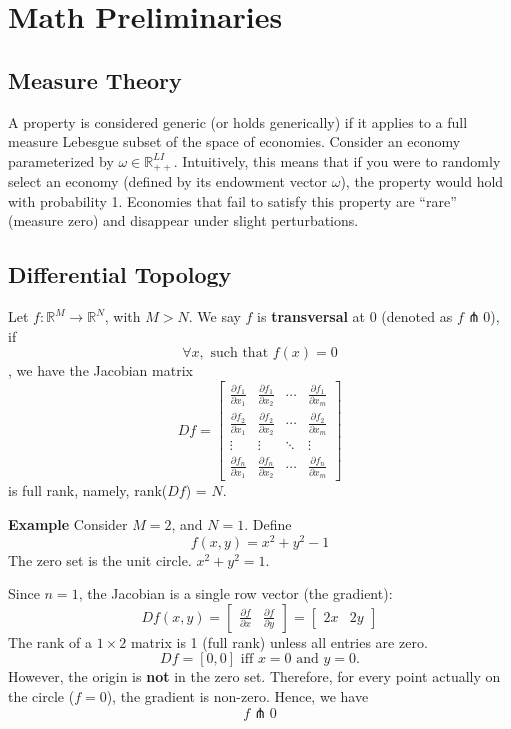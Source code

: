\chapter{Math Preliminaries}


\section{Measure Theory}
\begin{definition}[Genericity]
    A property is considered generic (or holds generically) 
    if it applies to a full measure Lebesgue subset of the space of economies. 
    Consider an economy parameterized by $\omega \in \mathbb{R}_{++}^{LI}$.
    Intuitively, this means that if you were to randomly select an economy 
    (defined by its endowment vector $\omega$), 
    the property would hold with probability 1. 
    Economies that fail to satisfy this property are ``rare'' (measure zero) 
    and disappear under slight perturbations.
\end{definition}


\section{Differential Topology}
\begin{definition}[Transversality]
    Let $f: \mathbb{R}^M \rightarrow \mathbb{R}^N$, with $M > N$.
    We say $f$ is \textbf{transversal} at $0$ (denoted as $f \pitchfork 0$), if 
    \[ \forall x, \text{ such that } f(x) = 0\], we have the Jacobian matrix
    \[
    Df = \begin{bmatrix}
    \frac{\partial f_1}{\partial x_1} & \frac{\partial f_1}{\partial x_2} & \cdots & \frac{\partial f_1}{\partial x_m} \\
    \frac{\partial f_2}{\partial x_1} & \frac{\partial f_2}{\partial x_2} & \cdots & \frac{\partial f_2}{\partial x_m} \\
    \vdots & \vdots & \ddots & \vdots \\
    \frac{\partial f_n}{\partial x_1} & \frac{\partial f_n}{\partial x_2} & \cdots & \frac{\partial f_n}{\partial x_m}
    \end{bmatrix} 
    \] is full rank, namely, rank($Df$) = $N$.
\end{definition}

\noindent \textbf{Example}
Consider $M = 2$, and $N = 1$.
Define
\[
f(x, y) = x^2 + y^2 - 1
\]
The zero set is the unit circle. $x^2 + y^2 = 1$.

Since $n=1$, the Jacobian is a single row vector (the gradient):
\[
Df(x,y) = 
\begin{bmatrix}
    \frac{\partial f}{\partial x} & \frac{\partial f}{\partial y}
\end{bmatrix}
= 
\begin{bmatrix}
    2x & 2y
\end{bmatrix}
\]
The rank of a $1 \times 2$ matrix is 1 (full rank) unless all entries are zero.
\[
Df = [0, 0] \text{ iff } x = 0 \text{ and } y = 0.
\]
However, the origin is \textbf{not} in the zero set. 
Therefore, for every point actually on the circle ($f=0$), the gradient is non-zero.
Hence, we have
\[
f \pitchfork 0
\]

